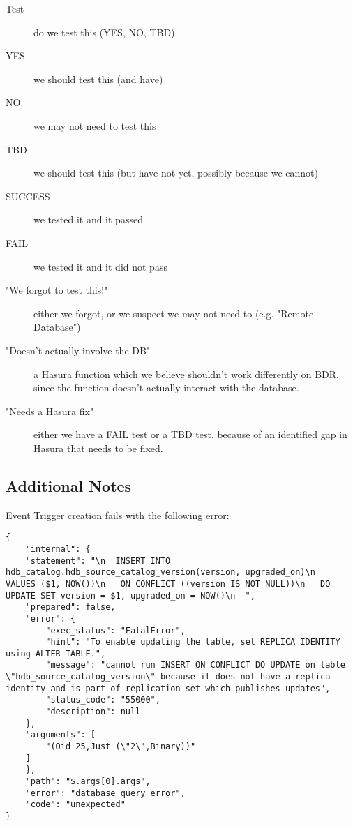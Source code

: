 \documentclass[11pt]{article}
\begin{document}
\begin{description}
\item[{Test}] do we test this (YES, NO, TBD)
\item[{YES}] we should test this (and have)
\item[{NO}] we may not need to test this
\item[{TBD}] we should test this (but have not yet, possibly because we
cannot)
\item[{SUCCESS}] we tested it and it passed
\item[{FAIL}] we tested it and it did not pass
\item[{"We forgot to test this!"}] either we forgot, or we suspect we may
not need to (e.g. "Remote Database")
\item[{"Doesn't actually involve the DB"}] a Hasura function which we
believe shouldn't work differently on BDR, since the function
doesn't actually interact with the database.
\item[{"Needs a Hasura fix"}] either we have a FAIL test or a TBD test,
because of an identified gap in Hasura that needs to be fixed.
\end{description}

\subsection{Additional Notes}
\label{sec:orgfe89b4c}

Event Trigger creation fails with the following error:

\begin{verbatim}
{
    "internal": {
	"statement": "\n  INSERT INTO hdb_catalog.hdb_source_catalog_version(version, upgraded_on)\n    VALUES ($1, NOW())\n   ON CONFLICT ((version IS NOT NULL))\n   DO UPDATE SET version = $1, upgraded_on = NOW()\n  ",
	"prepared": false,
	"error": {
	    "exec_status": "FatalError",
	    "hint": "To enable updating the table, set REPLICA IDENTITY using ALTER TABLE.",
	    "message": "cannot run INSERT ON CONFLICT DO UPDATE on table \"hdb_source_catalog_version\" because it does not have a replica identity and is part of replication set which publishes updates",
	    "status_code": "55000",
	    "description": null
	},
	"arguments": [
	    "(Oid 25,Just (\"2\",Binary))"
	]
    },
    "path": "$.args[0].args",
    "error": "database query error",
    "code": "unexpected"
}
\end{verbatim}
\end{document}
